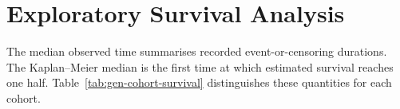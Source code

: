 \chapter{Exploratory Survival Analysis}\label{appendix-b-exploratory-survival-analysis}\label{app:survival}

The median observed time summarises recorded event-or-censoring durations. The Kaplan--Meier median is the first time at which estimated survival reaches one half. Table~\ref{tab:gen-cohort-survival} distinguishes these quantities for each cohort.


